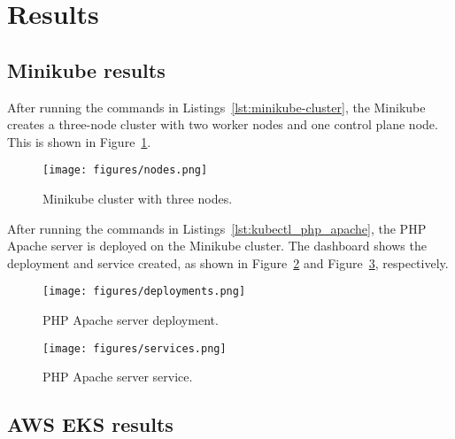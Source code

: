 \section{Results}
\subsection{Minikube results}
After running the commands in Listings~\ref{lst:minikube-cluster}, the Minikube creates a three-node cluster with two worker nodes and one control plane node.
This is shown in Figure~\ref{fig:minikube-cluster}.

\begin{figure}[htbp]
  \centering
  \texttt{[image: figures/nodes.png]}
  \caption{Minikube cluster with three nodes.}
  \label{fig:minikube-cluster}
\end{figure}

After running the commands in Listings~\ref{lst:kubectl_php_apache}, the PHP Apache server is deployed on the Minikube cluster.
The dashboard shows the deployment and service created, as shown in Figure~\ref{fig:deployments} and Figure~\ref{fig:services}, respectively.

\begin{figure}[htbp]
  \centering
  \texttt{[image: figures/deployments.png]}
  \caption{PHP Apache server deployment.}
  \label{fig:deployments}
\end{figure}

\begin{figure}[htbp]
  \centering
  \texttt{[image: figures/services.png]}
  \caption{PHP Apache server service.}
  \label{fig:services}
\end{figure}

\subsection{AWS EKS results}
